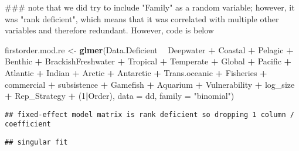 \documentclass[]{article}
\newenvironment{Shaded}{\begin{snugshade}}{\end{snugshade}}
\newcommand{\KeywordTok}[1]{\textcolor[rgb]{0.13,0.29,0.53}{\textbf{#1}}}
\newcommand{\DataTypeTok}[1]{\textcolor[rgb]{0.13,0.29,0.53}{#1}}
\newcommand{\DecValTok}[1]{\textcolor[rgb]{0.00,0.00,0.81}{#1}}
\newcommand{\StringTok}[1]{\textcolor[rgb]{0.31,0.60,0.02}{#1}}
\newcommand{\OperatorTok}[1]{\textcolor[rgb]{0.81,0.36,0.00}{\textbf{#1}}}
\newcommand{\NormalTok}[1]{#1}
\begin{document}
\begin{Shaded}
\begin{Highlighting}[]
\NormalTok{### note that we did try to include "Family" as a random variable; however, it was "rank deficient", which means that it was correlated with multiple other variables and therefore redundant. However, code is below}

\NormalTok{firstorder.mod.re <-}\StringTok{ }\KeywordTok{glmer}\NormalTok{(Data.Deficient }\OperatorTok{~}\StringTok{ }\NormalTok{Deepwater }\OperatorTok{+}\StringTok{ }\NormalTok{Coastal }\OperatorTok{+}\StringTok{ }\NormalTok{Pelagic }\OperatorTok{+}\StringTok{ }\NormalTok{Benthic }\OperatorTok{+}\StringTok{ }\NormalTok{BrackishFreshwater }\OperatorTok{+}\StringTok{ }
\StringTok{      }\NormalTok{Tropical }\OperatorTok{+}\StringTok{ }\NormalTok{Temperate }\OperatorTok{+}\StringTok{ }
\StringTok{      }\NormalTok{Global }\OperatorTok{+}\StringTok{ }\NormalTok{Pacific }\OperatorTok{+}\StringTok{ }\NormalTok{Atlantic }\OperatorTok{+}\StringTok{ }\NormalTok{Indian }\OperatorTok{+}\StringTok{ }\NormalTok{Arctic }\OperatorTok{+}\StringTok{ }\NormalTok{Antarctic }\OperatorTok{+}\StringTok{ }\NormalTok{Trans.oceanic }\OperatorTok{+}
\StringTok{      }\NormalTok{Fisheries }\OperatorTok{+}\StringTok{ }\NormalTok{commercial }\OperatorTok{+}\StringTok{ }\NormalTok{subsistence }\OperatorTok{+}\StringTok{ }\NormalTok{Gamefish }\OperatorTok{+}\StringTok{ }\NormalTok{Aquarium }\OperatorTok{+}\StringTok{ }\NormalTok{Vulnerability }\OperatorTok{+}\StringTok{ }
\StringTok{      }\NormalTok{log_size }\OperatorTok{+}\StringTok{ }\NormalTok{Rep_Strategy }\OperatorTok{+}
\StringTok{        }\NormalTok{(}\DecValTok{1}\OperatorTok{|}\NormalTok{Order), }\DataTypeTok{data =}\NormalTok{ dd, }\DataTypeTok{family =} \StringTok{"binomial"}\NormalTok{)}
\end{Highlighting}
\end{Shaded}

\begin{verbatim}
## fixed-effect model matrix is rank deficient so dropping 1 column / coefficient
\end{verbatim}

\begin{verbatim}
## singular fit
\end{verbatim}
\end{document}
